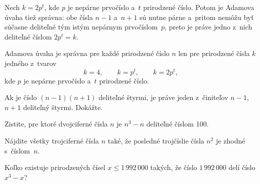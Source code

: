{Nech $k=2p^t$, kde $p$ je nepárne prvočíslo a~$t$ prirodzené číslo. Potom je
Adamova úvaha tiež správna: obe čísla $n-1$ a~$n+1$ sú nutne párne a~pritom nemôžu byť
súčasne deliteľné tým istým nepárnym prvočíslom~$p$, preto je práve jedno z~nich deliteľné
číslom $2p^t=k$.

\zaver
Adamova úvaha je správna pre každé prirodzené číslo $n$ len
pre prirodzené čísla $k$ jedného z~tvarov
$$
k=4,\qquad k=p^t,\qquad k=2p^t,
$$
kde $p$ je nepárne prvočíslo a~$t$ prirodzené číslo.

Ak je číslo $(n -1)(n + 1)$ deliteľné štyrmi, je práve jeden z~činiteľov $n-1$, $n+1$
deliteľný štyrmi. Dokážte.

Zistite, pre ktoré dvojciferné čísla $n$ je $n^3-n$ deliteľné číslom 100.
\vpravo{[50--C--S--3]}

Nájdite všetky trojciferné čísla $n$ také, že posledné trojčíslie čísla
$n^2$ je zhodné s~číslom~$n$.
\vpravo{[50--C--I--1]}

Koľko existuje prirodzených čísel  $x\leq 1\,992\,000$
takých, že číslo $1\,992\,000$ delí číslo $x^3-x$?
\vpravo{[41--B--I--6]}
}

